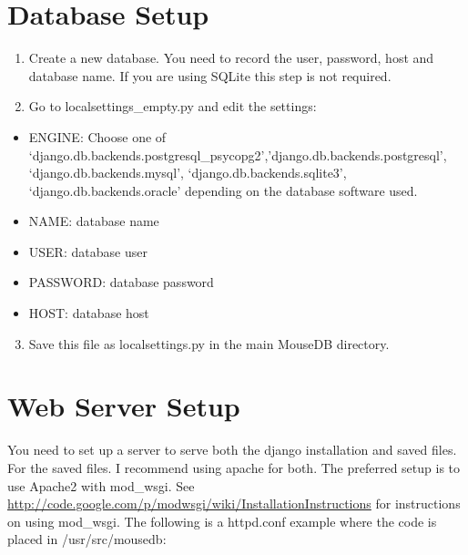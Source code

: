 \documentclass[letterpaper,10pt,english]{sphinxmanual}
\begin{document}
\section{Database Setup}
\label{installation:database-setup}\begin{enumerate}
\item {} 
Create a new database.  You need to record the user, password, host and database name.  If you are using SQLite this step is not required.

\item {} 
Go to localsettings\_empty.py and edit the settings:

\end{enumerate}
\begin{itemize}
\item {} 
ENGINE: Choose one of `django.db.backends.postgresql\_psycopg2','django.db.backends.postgresql', `django.db.backends.mysql', `django.db.backends.sqlite3', `django.db.backends.oracle' depending on the database software used.

\item {} 
NAME: database name

\item {} 
USER: database user

\item {} 
PASSWORD: database password

\item {} 
HOST: database host

\end{itemize}
\begin{enumerate}
\setcounter{enumi}{2}
\item {} 
Save this file as localsettings.py in the main MouseDB directory.

\end{enumerate}


\section{Web Server Setup}
\label{installation:web-server-setup}
You need to set up a server to serve both the django installation and saved files.  For the saved files.  I recommend using apache for both.  The preferred setup is to use Apache2 with mod\_wsgi.  See \href{http://code.google.com/p/modwsgi/wiki/InstallationInstructions}{http://code.google.com/p/modwsgi/wiki/InstallationInstructions} for instructions on using mod\_wsgi.  The following is a httpd.conf example where the code is placed in /usr/src/mousedb:
\end{document}

